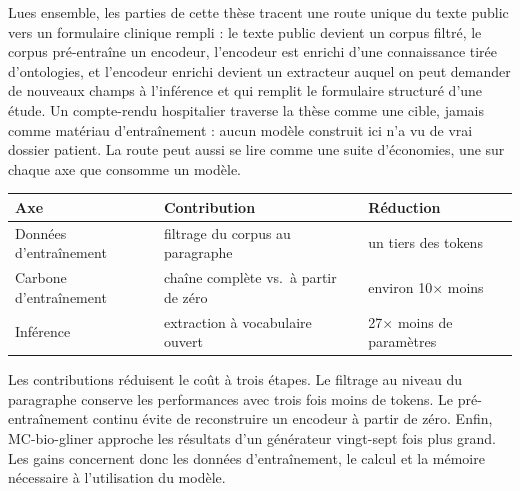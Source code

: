 

\noindent Lues ensemble, les parties de cette thèse tracent une route unique du texte public
vers un formulaire clinique rempli : le texte public devient un corpus filtré, le
corpus pré-entraîne un encodeur, l'encodeur est enrichi d'une connaissance tirée
d'ontologies, et l'encodeur enrichi devient un extracteur auquel on peut demander de
nouveaux champs à l'inférence et qui remplit le formulaire structuré d'une étude. Un
compte-rendu hospitalier traverse la thèse comme une cible, jamais comme matériau
d'entraînement : aucun modèle construit ici n'a vu de vrai dossier patient. La route
peut aussi se lire comme une suite d'économies, une sur chaque axe que consomme un
modèle.

\begin{center}
\begin{minipage}{\linewidth}
\centering
  \small
  \label{tab:conclusion-savings}
  \begin{tabular}{@{}lll@{}}
    \toprule
    \textbf{Axe} & \textbf{Contribution} & \textbf{Réduction} \\
    \midrule
    Données d'entraînement & filtrage du corpus au paragraphe & un tiers des tokens \\
    Carbone d'entraînement & chaîne complète vs.\ à partir de zéro & environ 10$\times$ moins \\
    Inférence & extraction à vocabulaire ouvert & 27$\times$ moins de paramètres \\
    \bottomrule
  \end{tabular}
\end{minipage}
\end{center}
\medskip

Les contributions réduisent le coût à trois étapes. Le filtrage au niveau du
paragraphe conserve les performances avec trois fois moins de tokens. Le
pré-entraînement continu évite de reconstruire un encodeur à partir de zéro. Enfin,
MC-bio-gliner approche les résultats d'un générateur vingt-sept fois plus grand. Les
gains concernent donc les données d'entraînement, le calcul et la mémoire nécessaire
à l'utilisation du modèle.

